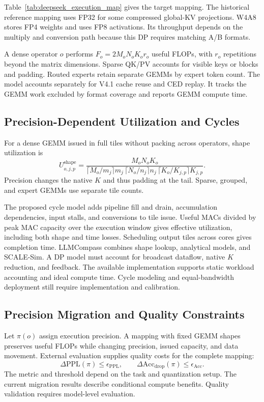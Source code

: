 \documentclass[conference,9pt,letterpaper]{IEEEtran}
\begin{document}
Table~\ref{tab:deepseek_execution_map} gives the target mapping. The historical reference mapping uses FP32 for some compressed global-KV projections. W4A8 stores FP4 weights and uses FP8 activations. Its throughput depends on the multiply and conversion path because this DP requires matching A/B formats.

A dense operator $o$ performs $F_o=2M_oN_oK_or_o$ useful FLOPs, with $r_o$ repetitions beyond the matrix dimensions. Sparse QK/PV accounts for visible keys or blocks and padding. Routed experts retain separate GEMMs by expert token count. The model accounts separately for V4.1 cache reuse and CED replay. It tracks the GEMM work excluded by format coverage and reports GEMM compute time.

\subsection{Precision-Dependent Utilization and Cycles}
\label{sec:compute_model}

For a dense GEMM issued in full tiles without packing across operators, shape utilization is
\begin{equation}
U_{o,j,p}^{\mathrm{shape}}=
\frac{M_oN_oK_o}
{\lceil M_o/m_j\rceil m_j\,
 \lceil N_o/n_j\rceil n_j\,
 \lceil K_o/K_{j,p}\rceil K_{j,p}}.
\label{eq:shape_utilization}
\end{equation}
Precision changes the native $K$ and thus padding at the tail. Sparse, grouped, and expert GEMMs use separate tile counts.

The proposed cycle model adds pipeline fill and drain, accumulation dependencies, input stalls, and conversions to tile issue. Useful MACs divided by peak MAC capacity over the execution window gives effective utilization, including both shape and time losses. Scheduling output tiles across cores gives completion time. LLMCompass combines shape lookup, analytical models, and SCALE-Sim. A DP model must account for broadcast dataflow, native $K$ reduction, and feedback. The available implementation supports static workload accounting and ideal compute time. Cycle modeling and equal-bandwidth deployment still require implementation and calibration.

\subsection{Precision Migration and Quality Constraints}
\label{sec:quality_model}

Let $\pi(o)$ assign execution precision. A mapping with fixed GEMM shapes preserves useful FLOPs while changing precision, issued capacity, and data movement. External evaluation supplies quality costs for the complete mapping:
\begin{equation}
\Delta\mathrm{PPL}(\pi)\le\epsilon_{\mathrm{PPL}},\qquad
\Delta\mathrm{Acc}_{\mathrm{drop}}(\pi)\le\epsilon_{\mathrm{Acc}}.
\label{eq:quality_constraint}
\end{equation}
The metric and threshold depend on the task and quantization setup. The current migration results describe conditional compute benefits. Quality validation requires model-level evaluation.
\end{document}
